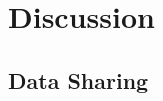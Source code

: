 \documentclass{frontiersSCNS} %
\begin{document}



\section{Discussion}

\subsection{Data Sharing}
\end{document}
